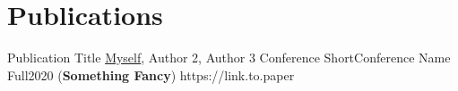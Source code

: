 \section{Publications}
\pubListStart

\pubItem
{Publication Title}
{\underline{Myself}, Author 2, Author 3}
{Conference Short}{Conference Name Full}{2020 (\textbf{Something Fancy})}
{https://link.to.paper}






\pubListEnd
